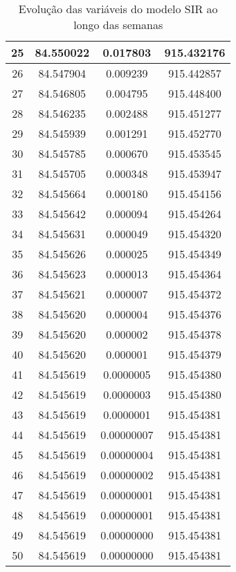 \documentclass{article}
\begin{document}
\begin{table}[htpb]
\begin{tabular}{|c|c|c|c|}
25 & 84.550022    & 0.017803    & 915.432176 \\ \hline
26 & 84.547904    & 0.009239    & 915.442857 \\ \hline
27 & 84.546805    & 0.004795    & 915.448400 \\ \hline
28 & 84.546235    & 0.002488    & 915.451277 \\ \hline
29 & 84.545939    & 0.001291    & 915.452770 \\ \hline
30 & 84.545785    & 0.000670    & 915.453545 \\ \hline
31 & 84.545705    & 0.000348    & 915.453947 \\ \hline
32 & 84.545664    & 0.000180    & 915.454156 \\ \hline
33 & 84.545642    & 0.000094    & 915.454264 \\ \hline
34 & 84.545631    & 0.000049    & 915.454320 \\ \hline
35 & 84.545626    & 0.000025    & 915.454349 \\ \hline
36 & 84.545623    & 0.000013    & 915.454364 \\ \hline
37 & 84.545621    & 0.000007    & 915.454372 \\ \hline
38 & 84.545620    & 0.000004    & 915.454376 \\ \hline
39 & 84.545620    & 0.000002    & 915.454378 \\ \hline
40 & 84.545620    & 0.000001    & 915.454379 \\ \hline
41 & 84.545619    & 0.0000005   & 915.454380 \\ \hline
42 & 84.545619    & 0.0000003   & 915.454380 \\ \hline
43 & 84.545619    & 0.0000001   & 915.454381 \\ \hline
44 & 84.545619    & 0.00000007  & 915.454381 \\ \hline
45 & 84.545619    & 0.00000004  & 915.454381 \\ \hline
46 & 84.545619    & 0.00000002  & 915.454381 \\ \hline
47 & 84.545619    & 0.00000001  & 915.454381 \\ \hline
48 & 84.545619    & 0.00000001  & 915.454381 \\ \hline
49 & 84.545619    & 0.00000000  & 915.454381 \\ \hline
50 & 84.545619    & 0.00000000  & 915.454381 \\ \hline
\end{tabular}
\caption{Evolução das variáveis do modelo SIR ao longo das semanas}
\end{table}
\end{document}
